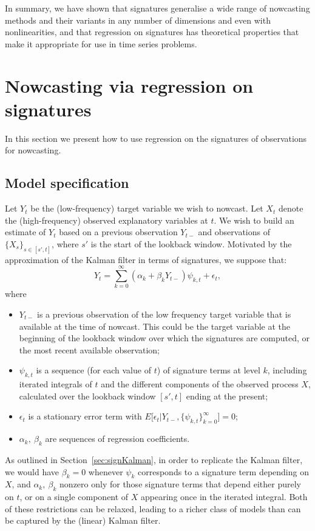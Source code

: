 \documentclass[a4paper, 12pt]{article}
\theoremstyle{remark}
\begin{document}
In summary, we have shown that signatures generalise a wide range of nowcasting methods and their variants in any number of dimensions and even with nonlinearities, and that regression on signatures has theoretical properties that make it appropriate for use in time series problems.

\section{Nowcasting via regression on signatures}\label{sec:sigregression}

In this section we present how to use regression on the signatures of observations for nowcasting.

\subsection{Model specification}

Let $Y_{t}$ be the (low-frequency) target variable we wish to nowcast. Let $X_{t}$ denote the (high-frequency) observed explanatory variables at \(t\). 
We wish to build an estimate of $Y_t$ based on a previous observation \(Y_{t-}\) and observations of \(\{ X_s \}_{s \in [s', t]}\), where \(s'\) is the start of the lookback window.
Motivated by the approximation of the Kalman filter in terms of signatures, we suppose that:
\begin{equation}
Y_t = \sum_{k=0}^{\infty} \left(\alpha_k+\beta_k Y_{t-} \right) \psi_{k,t} + \epsilon_t,  
\label{eqn:regressionsig}
\end{equation}
where
\begin{itemize}
    \item $Y_{t-}$ is a previous observation of the low frequency target variable that is available at the time of nowcast. This could be the target variable at the beginning of the lookback window over which the signatures are computed, or the most recent available observation;
    \item $\psi_{k,t}$ is a sequence (for each value of $t$) of signature terms at level \(k\), including iterated integrals of $t$ and the different components of the observed process $X$, calculated over the lookback window $[s',t]$ ending at the present;
    \item $\epsilon_t$ is a stationary error term with $E\big[ \epsilon_t \big| Y_{t-}, \{\psi_{k,t}\}_{k=0}^\infty \big]=0$;
    \item $\alpha_k, \: \beta_k$ are sequences of regression coefficients.
\end{itemize}
As outlined in Section~\ref{sec:signKalman}, in order to replicate the Kalman filter, we would have $\beta_k=0$ whenever $\psi_k$ corresponds to a signature term depending on $X$, and \(\alpha_k, \:\beta_k\) nonzero only for those signature terms that depend either purely on $t$, or on a single component of $X$ appearing once in the iterated integral. Both of these restrictions can be relaxed, leading to a richer class of models than can be captured by the (linear) Kalman filter.
\end{document}
